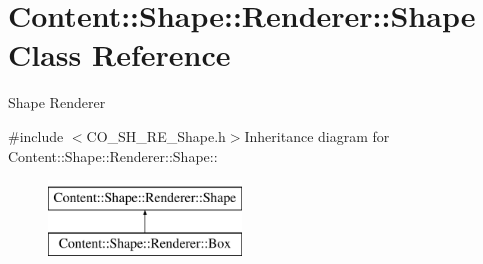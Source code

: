 \hypertarget{classContent_1_1Shape_1_1Renderer_1_1Shape}{
\section{Content::Shape::Renderer::Shape Class Reference}
\label{classContent_1_1Shape_1_1Renderer_1_1Shape}
}


Shape Renderer  


{\ttfamily \#include $<$CO\_\-SH\_\-RE\_\-Shape.h$>$}Inheritance diagram for Content::Shape::Renderer::Shape::\begin{figure}[H]
\begin{center}
\leavevmode
\includegraphics[height=2cm]{classContent_1_1Shape_1_1Renderer_1_1Shape}
\end{center}
\end{figure}
